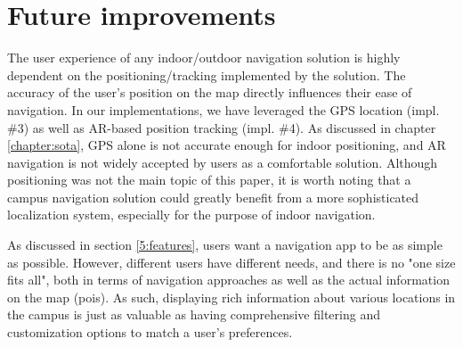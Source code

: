 \section{Future improvements}

    The user experience of any indoor/outdoor navigation solution is highly dependent on the positioning/tracking implemented by the solution. The accuracy of the user's position on the map directly influences their ease of navigation. In our implementations, we have leveraged the GPS location (impl. \#3) as well as AR-based position tracking (impl. \#4). As discussed in chapter \ref{chapter:sota}, GPS alone is not accurate enough for indoor positioning, and AR navigation is not widely accepted by users as a comfortable solution. Although positioning was not the main topic of this paper, it is worth noting that a campus navigation solution could greatly benefit from a more sophisticated localization system, especially for the purpose of indoor navigation.

    As discussed in section \ref{5:features}, users want a navigation app to be as simple as possible. However, different users have different needs, and there is no "one size fits all", both in terms of navigation approaches as well as the actual information on the map (\acrshort{poi}s). As such, displaying rich information about various locations in the campus is just as valuable as having comprehensive filtering and customization options to match a user's preferences.
